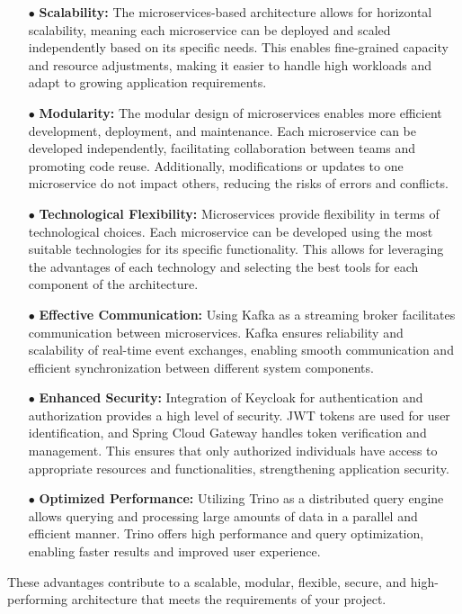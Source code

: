 \begin{enumerate}
\item[$\bullet$] \textbf{Scalability:} The microservices-based architecture allows for horizontal scalability, meaning each microservice can be deployed and scaled independently based on its specific needs. This enables fine-grained capacity and resource adjustments, making it easier to handle high workloads and adapt to growing application requirements.
\item[$\bullet$] \textbf{Modularity:} The modular design of microservices enables more efficient development, deployment, and maintenance. Each microservice can be developed independently, facilitating collaboration between teams and promoting code reuse. Additionally, modifications or updates to one microservice do not impact others, reducing the risks of errors and conflicts.
\item[$\bullet$] \textbf{Technological Flexibility:} Microservices provide flexibility in terms of technological choices. Each microservice can be developed using the most suitable technologies for its specific functionality. This allows for leveraging the advantages of each technology and selecting the best tools for each component of the architecture.
\item[$\bullet$] \textbf{Effective Communication:} Using Kafka as a streaming broker facilitates communication between microservices. Kafka ensures reliability and scalability of real-time event exchanges, enabling smooth communication and efficient synchronization between different system components.
\item[$\bullet$] \textbf{Enhanced Security:} Integration of Keycloak for authentication and authorization provides a high level of security. JWT tokens are used for user identification, and Spring Cloud Gateway handles token verification and management. This ensures that only authorized individuals have access to appropriate resources and functionalities, strengthening application security.
\item[$\bullet$] \textbf{Optimized Performance:} Utilizing Trino as a distributed query engine allows querying and processing large amounts of data in a parallel and efficient manner. Trino offers high performance and query optimization, enabling faster results and improved user experience.
\end{enumerate}

These advantages contribute to a scalable, modular, flexible, secure, and high-performing architecture that meets the requirements of your project.

